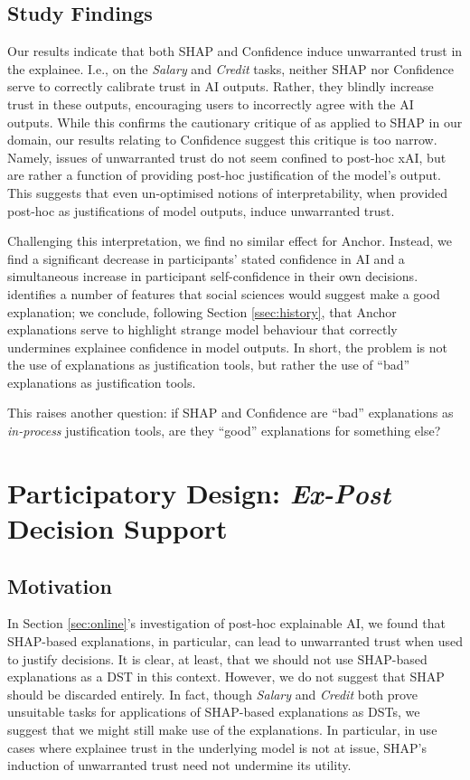 \subsection{Study Findings}\label{ssec:os_discussion}
Our results indicate that both SHAP and Confidence induce unwarranted trust in the explainee. I.e., on the \emph{Salary} and \emph{Credit} tasks, neither SHAP nor Confidence serve to correctly calibrate trust in AI outputs. Rather, they blindly increase trust in these outputs, encouraging users to incorrectly agree with the AI outputs. While this confirms the cautionary critique of \textcite{Lipton} as applied to SHAP in our domain, our results relating to Confidence suggest this critique is too narrow. Namely, issues of unwarranted trust do not seem confined to post-hoc xAI, but are rather a function of providing post-hoc justification of the model's output. This suggests that even un-optimised notions of interpretability, when provided post-hoc as justifications of model outputs, induce unwarranted trust.

Challenging this interpretation, we find no similar effect for Anchor. Instead, we find a significant decrease in participants' stated confidence in AI and a simultaneous increase in participant self-confidence in their own decisions. \textcite{Miller} identifies a number of features that social sciences would suggest make a good explanation; we conclude, following Section \ref{ssec:history}, that Anchor explanations serve to highlight strange model behaviour that correctly undermines explainee confidence in model outputs. In short, the problem is not the use of explanations as justification tools, but rather the use of ``bad'' explanations as justification tools.

This raises another question: if SHAP and Confidence are ``bad'' explanations as \emph{in-process} justification tools, are they ``good'' explanations for something else?

\section{Participatory Design: \emph{Ex-Post} Decision Support}\label{sec:case}
\subsection{Motivation}
In Section \ref{sec:online}'s investigation of post-hoc explainable AI, we found that SHAP-based explanations, in particular, can lead to unwarranted trust when used to justify decisions. It is clear, at least, that we should not use SHAP-based explanations as a DST in this context. However, we do not suggest that SHAP should be discarded entirely. In fact, though \emph{Salary} and \emph{Credit} both prove unsuitable tasks for applications of SHAP-based explanations as DSTs, we suggest that we might still make use of the explanations. In particular, in use cases where explainee trust in the underlying model is not at issue, SHAP's induction of unwarranted trust need not undermine its utility.


